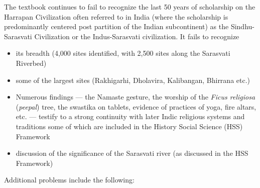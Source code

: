The textbook continues to fail to recognize the last 50 years of scholarship on the Harrapan Civilization often referred to in India (where the scholarship is predominantly centered post partition of the Indian subcontinent) as the Sindhu-Sarasvati Civilization or the Indus-Sarasvati civilization. It fails to recognize
\begin{itemize} 
\item its breadth (4,000 sites identified, with 2,500 sites along the Sarasvati Riverbed)
\item some of the largest sites (Rakhigarhi, Dholavira, Kalibangan, Bhirrana etc.)
\item Numerous findings — the Namaste gesture, the worship of the \textit{Ficus religiosa} (\textit{peepal}) tree, the swastika on tablets, evidence of practices of yoga, fire altars, etc. — testify to a strong continuity with later Indic religious systems and traditions some of which are included in the History Social Science (HSS) Framework
\item discussion of the significance of the Sarasvati river (as discussed in the HSS Framework)
\end{itemize}
Additional problems include the following:
